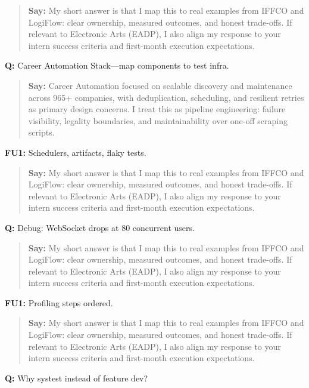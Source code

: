 \documentclass[9pt,a4paper]{article}
\begin{document}
\begin{quote}\small\textbf{Say:} My short answer is that I map this to real examples from IFFCO and LogiFlow: clear ownership, measured outcomes, and honest trade-offs. If relevant to Electronic Arts (EADP), I also align my response to your intern success criteria and first-month execution expectations.\end{quote}
\vspace{2mm}
\textbf{Q:} Career Automation Stack---map components to test infra.

\begin{quote}\small\textbf{Say:} Career Automation focused on scalable discovery and maintenance across 965+ companies, with deduplication, scheduling, and resilient retries as primary design concerns. I treat this as pipeline engineering: failure visibility, legality boundaries, and maintainability over one-off scraping scripts.\end{quote}
\vspace{2mm}
\textbf{FU1:} Schedulers, artifacts, flaky tests.

\begin{quote}\small\textbf{Say:} My short answer is that I map this to real examples from IFFCO and LogiFlow: clear ownership, measured outcomes, and honest trade-offs. If relevant to Electronic Arts (EADP), I also align my response to your intern success criteria and first-month execution expectations.\end{quote}
\vspace{2mm}
\textbf{Q:} Debug: WebSocket drops at 80 concurrent users.

\begin{quote}\small\textbf{Say:} My short answer is that I map this to real examples from IFFCO and LogiFlow: clear ownership, measured outcomes, and honest trade-offs. If relevant to Electronic Arts (EADP), I also align my response to your intern success criteria and first-month execution expectations.\end{quote}
\vspace{2mm}
\textbf{FU1:} Profiling steps ordered.

\begin{quote}\small\textbf{Say:} My short answer is that I map this to real examples from IFFCO and LogiFlow: clear ownership, measured outcomes, and honest trade-offs. If relevant to Electronic Arts (EADP), I also align my response to your intern success criteria and first-month execution expectations.\end{quote}
\vspace{2mm}
\textbf{Q:} Why systest instead of feature dev?
\end{document}
